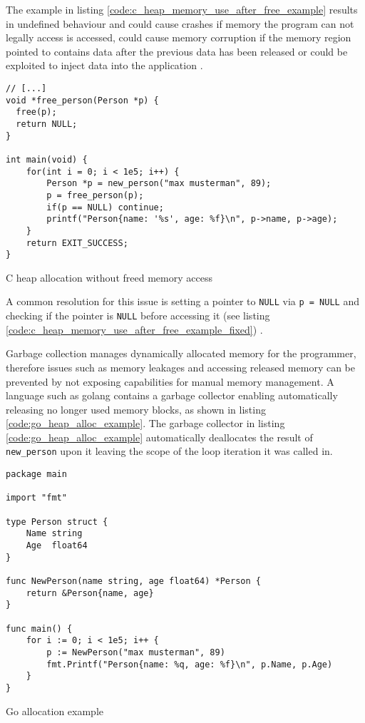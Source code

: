 The example in listing \autoref{code:c_heap_memory_use_after_free_example}
results in undefined behaviour
\cite[Description]{owasp-use-after-free_unkown_unknown} and could cause
crashes if memory the program can not legally access is accessed, could cause
memory corruption if the memory region pointed to contains data after the
previous data has been released or could be exploited to inject data into the
application \cite[Consequences]{owasp-use-after-free_unkown_unknown}.

\begin{listing}[H] 
    \begin{verbatim} 
// [...]
void *free_person(Person *p) {
  free(p);
  return NULL;
}

int main(void) {
    for(int i = 0; i < 1e5; i++) {
        Person *p = new_person("max musterman", 89);
        p = free_person(p);
        if(p == NULL) continue;
        printf("Person{name: '%s', age: %f}\n", p->name, p->age);
    }
    return EXIT_SUCCESS;
}
    \end{verbatim}
    \caption{C heap allocation without freed memory access}
    \label{code:c_heap_memory_use_after_free_example_fixed}
\end{listing}

A common resolution for this issue is setting a pointer to \texttt{NULL} via
\texttt{p = NULL} and checking if the pointer is \texttt{NULL} before
accessing it (see listing
\autoref{code:c_heap_memory_use_after_free_example_fixed}) \cite[Related
Controls]{owasp-use-after-free_unkown_unknown}. 

Garbage collection manages dynamically allocated memory for the programmer,
therefore issues such as memory leakages and accessing released memory can be
prevented by not exposing capabilities for manual memory management. A
language such as golang contains a garbage collector
\cite[Introduction]{go_spec_2023} enabling automatically releasing no longer
used memory blocks, as shown in listing \autoref{code:go_heap_alloc_example}.
The garbage collector in listing \autoref{code:go_heap_alloc_example}
automatically deallocates the result of \texttt{new\_person} upon it leaving
the scope of the loop iteration it was called in.

\begin{listing}[H] 
    \begin{verbatim} 
package main

import "fmt"

type Person struct {
    Name string
    Age  float64
}

func NewPerson(name string, age float64) *Person {
    return &Person{name, age}
}

func main() {
    for i := 0; i < 1e5; i++ {
        p := NewPerson("max musterman", 89)
        fmt.Printf("Person{name: %q, age: %f}\n", p.Name, p.Age)
    }
}
    \end{verbatim}
    \caption{Go allocation example}
    \label{code:go_heap_alloc_example}
\end{listing}
